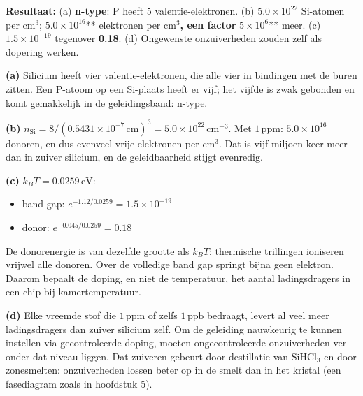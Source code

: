 \begin{oplossing}
\textbf{Resultaat:} (a) \textbf{n-type}: P heeft 5 valentie-elektronen. (b) \(5.0\times10^{22}\) Si-atomen per cm\ensuremath{^{3}}; \textbf{\(5.0\times10^{16}\)}** elektronen per cm\ensuremath{^{3}}\textbf{, een factor }\(5\times10^{6}\)** meer. (c) \(1.5\times10^{-19}\) tegenover \textbf{0.18}. (d) Ongewenste onzuiverheden zouden zelf als dopering werken.

\textbf{(a)} Silicium heeft vier valentie-elektronen, die alle vier in bindingen met de buren zitten. Een P-atoom op een Si-plaats heeft er vijf; het vijfde is zwak gebonden en komt gemakkelijk in de geleidingsband: n-type.

\textbf{(b)} \(n_{\mathrm{Si}} = 8/(0.5431\times10^{-7}\,\mathrm{cm})^3 = 5.0\times10^{22}\,\mathrm{cm^{-3}}\). Met \(1\,\mathrm{ppm}\): \(5.0\times10^{16}\) donoren, en dus evenveel vrije elektronen per cm\ensuremath{^{3}}. Dat is vijf miljoen keer meer dan in zuiver silicium, en de geleidbaarheid stijgt evenredig.

\textbf{(c)} \(k_BT = 0.0259\,\mathrm{eV}\):

\begin{itemize}
\item
  band gap: \(e^{-1.12/0.0259} = 1.5\times10^{-19}\)
\item
  donor: \(e^{-0.045/0.0259} = 0.18\)
\end{itemize}

De donorenergie is van dezelfde grootte als \(k_BT\): thermische trillingen ioniseren vrijwel alle donoren. Over de volledige band gap springt bijna geen elektron. Daarom bepaalt de doping, en niet de temperatuur, het aantal ladingsdragers in een chip bij kamertemperatuur.

\textbf{(d)} Elke vreemde stof die \(1\,\mathrm{ppm}\) of zelfs \(1\,\mathrm{ppb}\) bedraagt, levert al veel meer ladingsdragers dan zuiver silicium zelf. Om de geleiding nauwkeurig te kunnen instellen via gecontroleerde doping, moeten ongecontroleerde onzuiverheden ver onder dat niveau liggen. Dat zuiveren gebeurt door destillatie van \(\mathrm{SiHCl_3}\) en door zonesmelten: onzuiverheden lossen beter op in de smelt dan in het kristal (een fasediagram zoals in hoofdstuk 5).
\end{oplossing}

